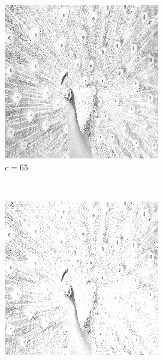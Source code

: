 \documentclass{article}
\begin{document}
\begin{enumerate}[label=(\alph*)]
\begin{figure}[!htb]
        \begin{subfigure}[b]{0.3\textwidth}
            \includegraphics[width=\textwidth]{img/LT65.png}
            \caption{$c = 65$}
        \end{subfigure}
        ~
        \begin{subfigure}[b]{0.3\textwidth}
            \includegraphics[width=\textwidth]{img/LT75.png}

\end{subfigure}
\end{figure}
\end{enumerate}
\end{document}
